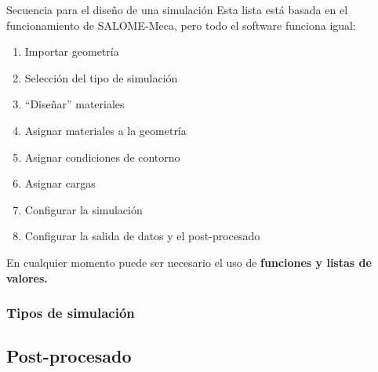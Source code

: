 \documentclass[12pt]{beamer}
\begin{document}
\begin{frame}{Secuencia para el diseño de una simulación}
	Esta lista está basada en el funcionamiento de SALOME-Meca, pero todo el software funciona igual:
	\begin{enumerate}
		\item Importar geometría
		\item Selección del tipo de simulación
		\item ``Diseñar'' materiales
		\item Asignar materiales a la geometría
		\item Asignar condiciones de contorno
		\item Asignar cargas
		\item Configurar la simulación
		\item Configurar la salida de datos y el post-procesado
	\end{enumerate}
	En cualquier momento puede ser necesario el uso de \textbf{funciones y listas de valores.} 
\end{frame}

\subsubsection{Tipos de simulación} %

\subsection{Post-procesado}
\end{document}
